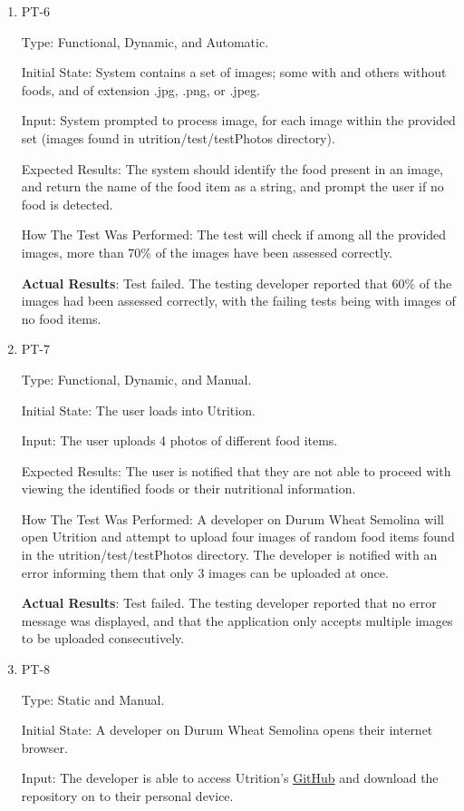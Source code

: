 \documentclass[12pt, titlepage]{article}
\begin{document}
\begin{enumerate}
		\item{PT-6}
		
		Type: Functional, Dynamic, and Automatic.
		
		Initial State: System contains a set of images; some with and others 
		without foods, and of extension .jpg, .png, or 
		.jpeg.
		
		Input: System prompted to process image, for each image 
		within the provided set (images found in utrition/test/testPhotos directory).
		
		Expected Results: The system should identify the food present in an image, 
		and return the name of the food item as a string, and prompt the user 
		if no food is detected.
		
		How The Test Was Performed: The test will check if among all the 
		provided images, more than 70\% of the images have been assessed 
		correctly.
		
		\textbf{Actual Results}: Test failed. The testing developer reported that 60\% of the images had been assessed correctly, with the failing tests being with images of no food items.
		
		\item{PT-7} 
		
		Type: Functional, Dynamic, and Manual.
		
		Initial State: The user loads into Utrition.
		
		Input: The user uploads 4 photos of different food items.
		
		Expected Results: The user is notified that they are not able to proceed with viewing the identified foods or their nutritional information.
		
		How The Test Was Performed: A developer on Durum Wheat Semolina will open Utrition and attempt to upload four images of random food items found in the utrition/test/testPhotos directory. The developer is notified with an error informing them that only 3 images can be uploaded at once.
		
		\textbf{Actual Results}: Test failed. The testing developer reported that no error message was displayed, and that the application only accepts multiple images to be uploaded consecutively.
		
		\item{PT-8} 
		
		Type: Static and Manual.
		
		Initial State: A developer on Durum Wheat Semolina opens their internet browser.
		
		Input: The developer is able to access Utrition’s  \href{https://github.com/jeff-rey-wang/utrition}{GitHub} and download the repository on to their personal device.
		

\end{enumerate}
\end{document}
